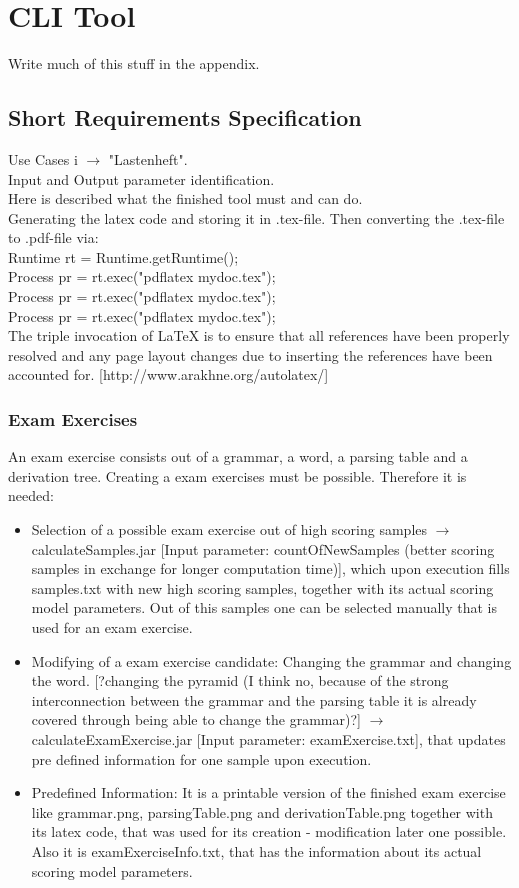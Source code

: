 
\section{CLI Tool}
Write much of this stuff in the appendix.
\subsection{Short Requirements Specification}
Use Cases i $\longrightarrow$ "Lastenheft".\\
Input and Output parameter identification.\\
Here is described what the finished tool must and can do.\\

\noindent Generating the latex code and storing it in .tex-file. Then converting the .tex-file to .pdf-file via:\\
Runtime rt = Runtime.getRuntime();\\
Process pr = rt.exec("pdflatex mydoc.tex");\\
Process pr = rt.exec("pdflatex mydoc.tex");\\
Process pr = rt.exec("pdflatex mydoc.tex");\\
The triple invocation of LaTeX is to ensure that all references have been properly resolved and any page layout changes due to inserting the references have been accounted for. [http://www.arakhne.org/autolatex/]

\subsubsection{Exam Exercises}
An exam exercise consists out of a grammar, a word, a parsing table and a derivation tree. Creating a exam exercises must be possible. Therefore it is needed:
\begin{itemize}
	\item Selection of a possible exam exercise out of high scoring samples $\longrightarrow$ calculateSamples.jar [Input parameter: countOfNewSamples (better scoring samples in exchange for longer computation time)], which upon execution fills samples.txt with new high scoring samples, together with its actual scoring model parameters. Out of this samples one can be selected manually that is used for an exam exercise.
	\item Modifying of a exam exercise candidate: Changing the grammar and changing the word. [?changing the pyramid (I think no, because of the strong interconnection between the grammar and the parsing table it is already covered through being able to change the grammar)?] $\longrightarrow$ calculateExamExercise.jar [Input parameter: examExercise.txt], that updates pre defined information for one sample upon execution.
	\item Predefined Information: It is a printable version of the finished exam exercise like grammar.png, parsingTable.png and derivationTable.png together with its latex code, that was used for its creation - modification later one possible. Also it is examExerciseInfo.txt, that has the information about its actual scoring model parameters. 
\end{itemize}

